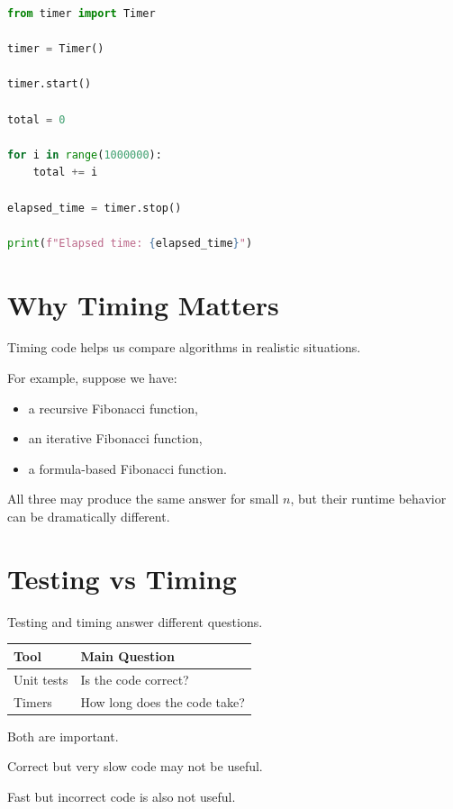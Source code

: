 \documentclass[11pt]{article}
\begin{document}
\begin{lstlisting}[language=Python]
from timer import Timer

timer = Timer()

timer.start()

total = 0

for i in range(1000000):
    total += i

elapsed_time = timer.stop()

print(f"Elapsed time: {elapsed_time}")
\end{lstlisting}

\section{Why Timing Matters}

Timing code helps us compare algorithms in realistic situations.

For example, suppose we have:

\begin{itemize}
    \item a recursive Fibonacci function,
    \item an iterative Fibonacci function,
    \item a formula-based Fibonacci function.
\end{itemize}

All three may produce the same answer for small \(n\), but their runtime behavior can be dramatically different.

\section{Testing vs Timing}

Testing and timing answer different questions.

\begin{center}
\begin{tabular}{ll}
\toprule
Tool & Main Question \\
\midrule
Unit tests & Is the code correct? \\
Timers & How long does the code take? \\
\bottomrule
\end{tabular}
\end{center}

Both are important.

Correct but very slow code may not be useful.

Fast but incorrect code is also not useful.
\end{document}
